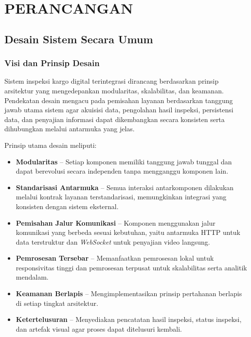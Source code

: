 \cleardoublepage
\chapter{PERANCANGAN}
\label{chap:perancangan}

\section{Desain Sistem Secara Umum}
\label{sec:desain-sistem-umum}

\subsection{Visi dan Prinsip Desain}
\label{subsec:visi-prinsip}

Sistem inspeksi kargo digital terintegrasi dirancang berdasarkan prinsip arsitektur yang mengedepankan modularitas, skalabilitas, dan keamanan. Pendekatan desain mengacu pada pemisahan layanan berdasarkan tanggung jawab utama sistem agar akuisisi data, pengolahan hasil inspeksi, persistensi data, dan penyajian informasi dapat dikembangkan secara konsisten serta dihubungkan melalui antarmuka yang jelas.

Prinsip utama desain meliputi:
\begin{itemize}
  \item \textbf{Modularitas} -- Setiap komponen memiliki tanggung jawab tunggal dan dapat berevolusi secara independen tanpa mengganggu komponen lain.
  \item \textbf{Standarisasi Antarmuka} -- Semua interaksi antarkomponen dilakukan melalui kontrak layanan terstandarisasi, memungkinkan integrasi yang konsisten dengan sistem eksternal.
  \item \textbf{Pemisahan Jalur Komunikasi} -- Komponen menggunakan jalur komunikasi yang berbeda sesuai kebutuhan, yaitu antarmuka HTTP untuk data terstruktur dan \textit{WebSocket} untuk penyajian video langsung.
  \item \textbf{Pemrosesan Tersebar} -- Memanfaatkan pemrosesan lokal untuk responsivitas tinggi dan pemrosesan terpusat untuk skalabilitas serta analitik mendalam.
  \item \textbf{Keamanan Berlapis} -- Mengimplementasikan prinsip pertahanan berlapis di setiap tingkat arsitektur.
  \item \textbf{Ketertelusuran} -- Menyediakan pencatatan hasil inspeksi, status inspeksi, dan artefak visual agar proses dapat ditelusuri kembali.
\end{itemize}

